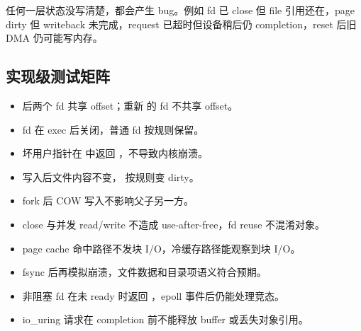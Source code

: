 任何一层状态没写清楚，都会产生 bug。例如 fd 已 close 但 file 引用还在，page dirty 但 writeback 未完成，request 已超时但设备稍后仍 completion，reset 后旧 DMA 仍可能写内存。

\subsection{实现级测试矩阵}

\begin{rubricbox}
\begin{itemize}
\tightlist
\item {} 后两个 fd 共享 offset；重新  的 fd 不共享 offset。
\item {} fd 在 exec 后关闭，普通 fd 按规则保留。
\item 坏用户指针在  中返回 ，不导致内核崩溃。
\item {} 写入后文件内容不变， 按规则变 dirty。
\item fork 后 COW 写入不影响父子另一方。
\item close 与并发 read/write 不造成 use-after-free，fd reuse 不混淆对象。
\item page cache 命中路径不发块 I/O，冷缓存路径能观察到块 I/O。
\item fsync 后再模拟崩溃，文件数据和目录项语义符合预期。
\item 非阻塞 fd 在未 ready 时返回 ，epoll 事件后仍能处理竞态。
\item io\_uring 请求在 completion 前不能释放 buffer 或丢失对象引用。
\end{itemize}
\end{rubricbox}
